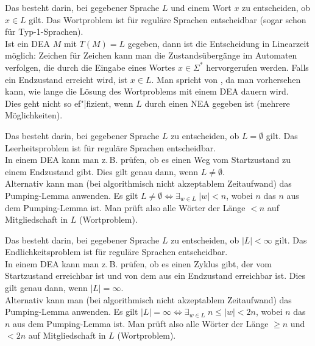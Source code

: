 \begin{Bem}
    Das  besteht darin, bei gegebener Sprache $L$
    und einem Wort $x$ zu entscheiden, ob $x \in L$ gilt.
    Das Wortproblem ist für reguläre Sprachen entscheidbar
    (sogar schon für Typ-1-Sprachen).\\
    Ist ein DEA $M$ mit $T(M) = L$ gegeben, dann ist die Entscheidung in
    Linearzeit möglich:
    Zeichen für Zeichen kann man die Zustandsübergänge im Automaten verfolgen,
    die durch die Eingabe eines Wortes $x \in \Sigma^\ast$ hervorgerufen
    werden.
    Falls ein Endzustand erreicht wird, ist $x \in L$.
    Man spricht von , da man vorhersehen kann, wie lange
    die Lösung des Wortproblems mit einem DEA dauern wird.\\
    Dies geht nicht so ef"|fizient, wenn $L$ durch einen NEA gegeben ist
    (mehrere Möglichkeiten).
\end{Bem}

\linie

\begin{Bem}
    Das  besteht darin, bei gegebener Sprache $L$
    zu entscheiden, ob $L = \emptyset$ gilt.
    Das Leerheitsproblem ist für reguläre Sprachen entscheidbar.\\
    In einem DEA kann man z.\,B. prüfen, ob es einen Weg vom Startzustand zu
    einem Endzustand gibt.
    Dies gilt genau dann, wenn $L \not= \emptyset$.\\
    Alternativ kann man (bei algorithmisch nicht akzeptablem Zeitaufwand)
    das Pumping-Lemma anwenden.
    Es gilt $L \not= \emptyset \iff \exists_{w \in L}\; |w| < n$, wobei
    $n$ das $n$ aus dem Pumping-Lemma ist.
    Man prüft also alle Wörter der Länge $< n$ auf Mitgliedschaft
    in $L$ (Wortproblem).
\end{Bem}

\linie

\begin{Bem}
    Das  besteht darin, bei gegebener Sprache $L$
    zu entscheiden, ob $|L| < \infty$ gilt.
    Das Endlichkeitsproblem ist für reguläre Sprachen entscheidbar.\\
    In einem DEA kann man z.\,B. prüfen, ob es einen Zyklus gibt, der
    vom Startzustand erreichbar ist und von dem aus ein Endzustand erreichbar
    ist.
    Dies gilt genau dann, wenn $|L| = \infty$.\\
    Alternativ kann man (bei algorithmisch nicht akzeptablem Zeitaufwand)
    das Pumping-Lemma anwenden.
    Es gilt $|L| = \infty \iff \exists_{w \in L}\; n \le |w| < 2n$, wobei
    $n$ das $n$ aus dem Pumping-Lemma ist.
    Man prüft also alle Wörter der Länge $\ge n$ und $< 2n$ auf Mitgliedschaft
    in $L$ (Wortproblem).
\end{Bem}

